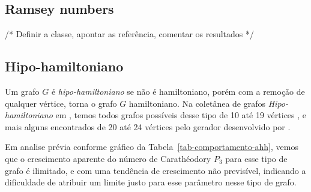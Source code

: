\subsection{Ramsey numbers}
/* Definir a classe, apontar as referência, comentar os resultados */



\subsection{Hipo-hamiltoniano}
Um grafo $G$ é \textit{hipo-hamiltoniano} se não é hamiltoniano,
porém com a remoção de qualquer vértice, torna o grafo $G$ hamiltoniano.
Na coletânea de grafos \textit{Hipo-hamiltoniano} em \cite{hog2013},
temos todos grafos possíveis desse tipo de 10 até 19 vértices \cite{Aldred1997,Goedgebeur2016},
e mais alguns encontrados de 20 até 24 vértices pelo gerador desenvolvido por \cite{Goedgebeur2016a}.

Em analise prévia conforme gráfico da Tabela~\ref{tab-comportamento-ahh},
vemos que o crescimento aparente do número de Carathéodory $P_3$
para esse tipo de grafo é ilimitado, e com uma tendência
de crescimento não previsível, 
indicando a dificuldade de atribuir um limite justo para
esse parâmetro nesse tipo de grafo. 


